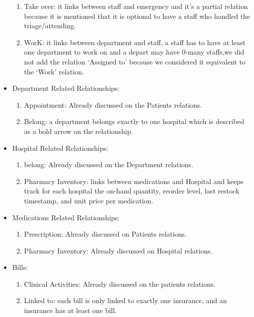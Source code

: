 \documentclass[a4paper,12pt]{article}
\begin{document}
\begin{itemize}
\begin{enumerate}
        \item Take over: it links between staff and emergency and it's a partial relation because it is mentioned that it is optional to have a staff who handled the triage/attending. 
        \item WorK: it links between department and staff, a staff has to have at least one department to work on and a depart may have 0-many staffs,we did not add the relation ‘Assigned to’ because we considered it equivalent to the ‘Work’ relation.
    \end{enumerate}
    \item Department Related Relationships:
    \begin{enumerate}
        \item Appointment: Already discussed on the Patients relations.
        \item Belong: a department belongs exactly to one hospital which is described as a bold arrow on the relationship.
    \end{enumerate}
    \item Hospital Related Relationships:
    \begin{enumerate}
        \item belong: Already discussed on the Department relations.
        \item Pharmacy Inventory: links between medications and Hospital and keeps track for each hospital the on-hand quantity, reorder level, last restock timestamp,
and unit price per medication.
    \end{enumerate}
    \item Medications Related Relationships:
    \begin{enumerate}
        \item Prescription: Already discussed on Patients relations.
        \item Pharmacy Inventory: Already discussed on Hospital relations.
    \end{enumerate}
    \item Bills:
    \begin{enumerate}
        \item Clinical Activities: Already discussed on the patients relations.
        \item Linked to: each bill is only linked to exactly one
insurance, and an insurance has at least one bill.
    \end{enumerate}
\end{itemize} 
\end{document}
